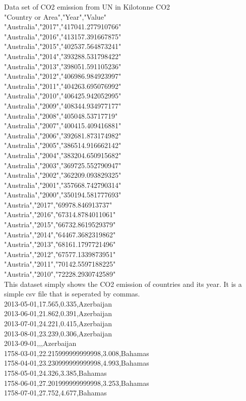 \documentclass[fontsize=11pt]{article}
\begin{document}
Data set of CO2 emission from UN in Kilotonne CO2 \\
"Country or Area","Year","Value" \\
"Australia","2017","417041.277910766" \\
"Australia","2016","413157.391667875"\\
"Australia","2015","402537.564873241"\\
"Australia","2014","393288.531798422"\\
"Australia","2013","398051.591105236"\\
"Australia","2012","406986.984923997"\\
"Australia","2011","404263.695076992"\\
"Australia","2010","406425.942052995"\\
"Australia","2009","408344.934977177"\\
"Australia","2008","405048.53717719"\\
"Australia","2007","400415.409416881"\\
"Australia","2006","392681.873174982"\\
"Australia","2005","386514.916662142"\\
"Australia","2004","383204.650915682"\\
"Australia","2003","369725.552790947"\\
"Australia","2002","362209.093829325"\\
"Australia","2001","357668.742790314"\\
"Australia","2000","350194.581777693"\\
"Austria","2017","69978.846913737"\\
"Austria","2016","67314.8784011061"\\
"Austria","2015","66732.8619529379"\\
"Austria","2014","64467.3682319862"\\
"Austria","2013","68161.1797721496"\\
"Austria","2012","67577.1339873951"\\
"Austria","2011","70142.5597188225"\\
"Austria","2010","72228.2930742589"\\

This dataset simply shows the CO2 emission of countries and its year. It is a simple csv file that is seperated by commas. \\ 
2013-05-01,17.565,0.335,Azerbaijan \\
2013-06-01,21.862,0.391,Azerbaijan \\
2013-07-01,24.221,0.415,Azerbaijan \\
2013-08-01,23.239,0.306,Azerbaijan \\
2013-09-01,,,Azerbaijan \\
1758-03-01,22.215999999999998,3.008,Bahamas \\
1758-04-01,23.230999999999998,4.993,Bahamas \\
1758-05-01,24.326,3.385,Bahamas \\
1758-06-01,27.201999999999998,3.253,Bahamas \\
1758-07-01,27.752,4.677,Bahamas \\
\end{document}
